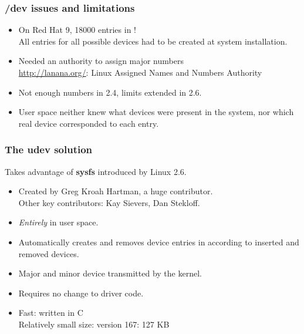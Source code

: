 
\begin{frame}
  \frametitle{/dev issues and limitations}
  \begin{itemize}
  \item On Red Hat 9, 18000 entries in !\\
    All entries for all possible devices had to be created at system
    installation.
  \item Needed an authority to assign major numbers\\
    \url{http://lanana.org/}: Linux Assigned Names and Numbers
    Authority
  \item Not enough numbers in 2.4, limits extended in 2.6.
  \item User space neither knew what devices were present in the
    system, nor which real device corresponded to each 
    entry.
  \end{itemize}
\end{frame}

\begin{frame}
  \frametitle{The udev solution}
  Takes advantage of {\bf sysfs} introduced by Linux 2.6.
  \begin{itemize}
  \item Created by Greg Kroah Hartman, a huge contributor.\\
    Other key contributors: Kay Sievers, Dan Stekloff.
  \item {\em Entirely} in user space.
  \item Automatically creates and removes device entries in
     according to inserted and removed devices.
  \item Major and minor device transmitted by the kernel.
  \item Requires no change to driver code.
  \item Fast: written in C\\
    Relatively small size:  version 167: 127 KB
  \end{itemize}
\end{frame}


